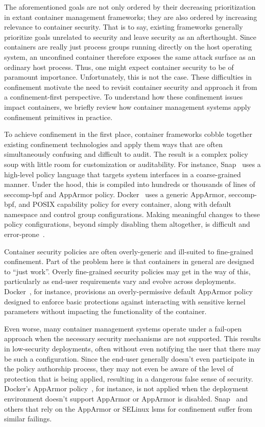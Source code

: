 The aforementioned goals are not only ordered by their decreasing prioritization in extant
container management frameworks; they are also ordered by increasing relevance to
container security. That is to say, existing frameworks generally prioritize goals
unrelated to security and leave security as an afterthought. Since containers are really
just process groups running directly on the host operating system, an unconfined container
therefore exposes the same attack surface as an ordinary host process. Thus, one might
expect container security to be of paramount importance. Unfortunately, this is not the
case. These difficulties in confinement motivate the need to revisit container security
and approach it from a confinement-first perspective. To understand how these confinement
issues impact containers, we briefly review how container management systems apply
confinement primitives in practice.

To achieve confinement in the first place, container frameworks cobble together existing
confinement technologies and apply them ways that are often simultaneously confusing and
difficult to audit. The result is a complex policy soup with little room for customization
or auditability. For instance, Snap~\cite{snap} uses a high-level policy language that
targets system interfaces in a coarse-grained manner. Under the hood, this is compiled
into hundreds or thousands of lines of seccomp-bpf and AppArmor policy.
Docker~\cite{docker_security, docker_default_apparmor, docker_apparmor} uses a generic
AppArmor, seccomp-bpf, and POSIX capability policy for every container, along with default
namespace and control group configurations. Making meaningful changes to these policy
configurations, beyond simply disabling them altogether, is difficult and
error-prone~\cite{lin2018_container_security}.

Container security policies are often overly-generic and ill-suited to fine-grained
confinement. Part of the problem here is that containers in general are designed to
\enquote{just work}. Overly fine-grained security policies may get in the way of this,
particularly as end-user requirements vary and evolve across deployments.
Docker~\cite{docker_security}, for instance, provisions an overly-permissive default
AppArmor policy~\cite{docker_default_apparmor} designed to enforce basic protections
against interacting with sensitive kernel parameters without impacting the functionality
of the container. %

Even worse, many container management systems operate under a fail-open approach when the
necessary security mechanisms are not supported. This results in low-security deployments,
often without even notifying the user that there may be such a configuration. Since the
end-user generally doesn't even participate in the policy authorship process, they may not
even be aware of the level of protection that is being applied, resulting in a dangerous
false sense of security. Docker's AppArmor policy~\cite{docker_apparmor,
docker_default_apparmor}, for instance, is not applied when the deployment environment
doesn't support AppArmor or AppArmor is disabled. Snap~\cite{snap} and others that rely on
the AppArmor or SELinux \glspl{lsm} for confinement suffer from similar failings.


